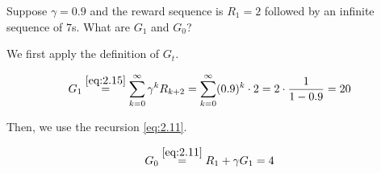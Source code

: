 
\begin{exercise}[Exercise 3.9]

Suppose $\gamma = 0.9$ and the reward sequence is $R_1 = 2$ followed by an infinite sequence of $7$s.
What are $G_1$ and $G_0$?    

\end{exercise}


\begin{solution}

We first apply the definition of $G_t$.

\begin{align*}
    G_1
    \stackrel
    {
        \eqref{eq:2.15}
    }{=}
    \sum_{k=0}^\infty
        \gamma^k R_{k+2}
    =
    \sum_{k=0}^\infty
        (0.9)^k \cdot 2
    =
    2 \cdot \frac{1}{1 - 0.9}
    =
    20
\end{align*}

Then, we use the recursion \eqref{eq:2.11}.

\begin{align*}
    G_0
    \stackrel
    {
        \eqref{eq:2.11}
    }{=}
    R_1 + \gamma G_1 = 4
\end{align*}

\end{solution}


